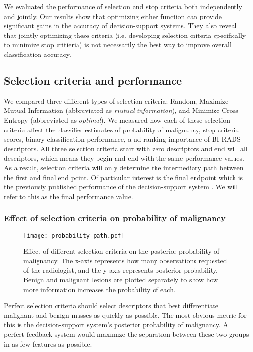 We evaluated the performance of selection and stop criteria both independently and jointly. Our results show that optimizing either function can provide significant gains in the accuracy of decision-support systems. They also reveal that jointly optimizing these criteria (i.e. developing selection criteria specifically to minimize stop critieria) is not necessarily the best way to improve overall classification accuracy.

\subsection{Selection criteria and performance}
We compared three different types of selection criteria: Random, Maximize Mutual Information (abbreviated as \emph{mutual information}), and Minimize Cross-Entropy (abbreviated as \emph{optimal}). We measured how each of these selection criteria affect the classifier estimates of probability of malignancy, stop criteria scores, binary classification performance, a nd ranking importance of BI-RADS descriptors. 
All three selection criteria start with zero descriptors and end will all descriptors, which means they begin and end with the same performance values. As a result, selection criteria will only determine the intermediary path between the first and final end point. Of particular interest is the final endpoint which is the previously published performance of the decision-support system \cite{Gimenez:2014tr,Burnside:2009br}. We will refer to this as the final performance value.

\subsubsection{Effect of selection criteria on probability of malignancy}

\begin{figure}[h]
	\centering
	\texttt{[image: probability\_path.pdf]}
	\caption[Effect of selection criteria on probability of malignancy]{Effect of different selection criteria on the posterior probability of malignancy. The x-axis represents how many observations requested of the radiologist, and the y-axis represents posterior probability. Benign and malignant lesions are plotted separately to show how more information increases the probability of each. }
	\label{fig:feedback_mammo}
\end{figure}


Perfect selection criteria should select descriptors that best differentiate malignant and benign masses as quickly as possible. The most obvious metric for this is the decision-support system's posterior probability of malignancy.  A perfect feedback system would maximize the separation between these two groups in as few features as possible.

